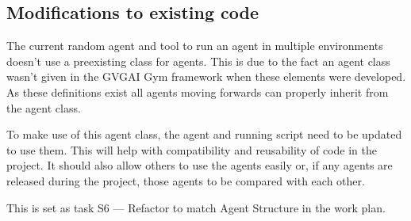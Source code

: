 \documentclass[a4paper]{article}
\begin{document}
\subsection{Modifications to existing code}
The current random agent and tool to run an agent in multiple environments doesn't use a preexisting class for agents.
This is due to the fact an agent class wasn't given in the GVGAI Gym framework when these elements were developed.
As these definitions exist all agents moving forwards can properly inherit from the agent class.
\par
To make use of this agent class, the agent and running script need to be updated to use them.
This will help with compatibility and reusability of code in the project.
It should also allow others to use the agents easily or, if any agents are released during the project, those agents to be compared with each other.
\par
This is set as task S6 --- Refactor to match Agent Structure in the work plan.
\end{document}
